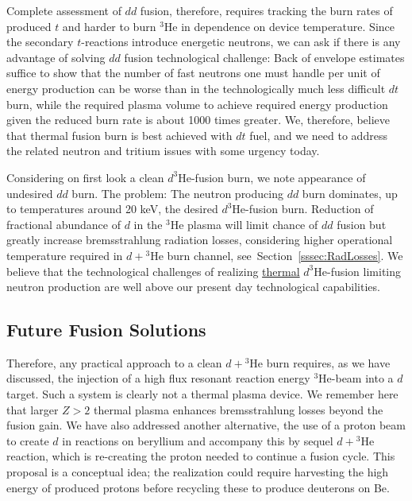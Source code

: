 \documentclass[particles,article,accept,pdftex,moreauthors]{Definitions/mdpi}
\newcommand{\rsec}[1]{Section~\ref{#1}}
\begin{document}
Complete assessment of $dd$ fusion, therefore, requires tracking the burn rates of produced $t$ and harder to burn ${}^3\mathrm{He}$ in dependence on device temperature. Since the secondary $t$-reactions introduce energetic neutrons, we can ask if there is any advantage of solving $dd$ fusion technological challenge: Back of envelope estimates suffice to show that the number of fast neutrons one must handle per unit of energy production can be worse than in the technologically much less difficult $dt$ burn, while the required plasma volume to achieve required energy production given the reduced burn rate is about 1000 times greater. We, therefore, believe that thermal fusion burn is best achieved with $dt$ fuel, and we need to address the related neutron and tritium issues with some urgency today.
 
Considering on first look a clean ${d}^{3\!}\mathrm{He}$-fusion burn, we note appearance of undesired $dd$ burn. The problem: The neutron producing $dd$ burn dominates, up to temperatures around 20 keV, the desired ${d}^{3\!}\mathrm{He}$-fusion burn. Reduction of fractional abundance of $d$ in the ${}^3\mathrm{He}$ plasma will limit chance of $dd$ fusion but greatly increase bremsstrahlung radiation losses, considering higher operational temperature required in $d+{}^3\mathrm{He}$ burn channel, see~\rsec{sssec:RadLosses}. We believe that the technological challenges of realizing \underline{thermal} ${d}^{3\!}\mathrm{He}$-fusion limiting neutron production are well above our present day technological capabilities. 

\subsection{Future Fusion Solutions}
Therefore, any practical approach to a clean $d+{}^3\mathrm{He}$ burn requires, as we have discussed, the injection of a high flux resonant reaction energy ${}^3\mathrm{He}$-beam into a $d$ target. Such a system is clearly not a thermal plasma device. We remember here that larger $Z>2$ thermal plasma enhances bremsstrahlung losses beyond the fusion gain. We have also addressed another alternative, the use of a proton beam to create $d$ in reactions on beryllium and accompany this by sequel $d+{}^3\mathrm{He}$ reaction, which is re-creating the proton needed to continue a fusion cycle. This proposal is a conceptual idea; the realization could require harvesting the high energy of produced protons before recycling these to produce deuterons on Be.
\end{document}
